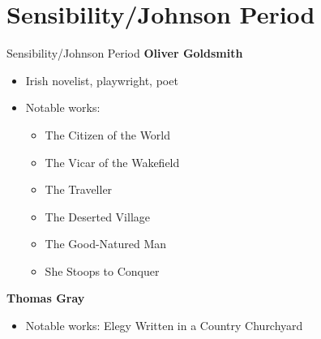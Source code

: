 \documentclass[
  12pt,
    progressbar=frametitle]{beamer}
\providecommand{\tightlist}{%
  \setlength{\itemsep}{0pt}\setlength{\parskip}{0pt}}
\begin{document}
\section{Sensibility/Johnson Period}
\begin{frame}[allowframebreaks]
{Sensibility/Johnson Period}
\large\textbf{Oliver Goldsmith}\normalsize\vspace{-3mm}

\begin{itemize}
\tightlist
\item
  Irish novelist, playwright, poet
\item
  Notable works:

  \begin{itemize}
  \tightlist
  \item
    The Citizen of the World
  \item
    The Vicar of the Wakefield
  \item
    The Traveller
  \item
    The Deserted Village
  \item
    The Good-Natured Man
  \item
    She Stoops to Conquer
  \end{itemize}
\end{itemize}

\vspace{15mm}
\large\textbf{Thomas Gray}\normalsize\vspace{-3mm}

\begin{itemize}
\tightlist
\item
  Notable works: Elegy Written in a Country Churchyard
\end{itemize}
\end{frame}
\end{document}
